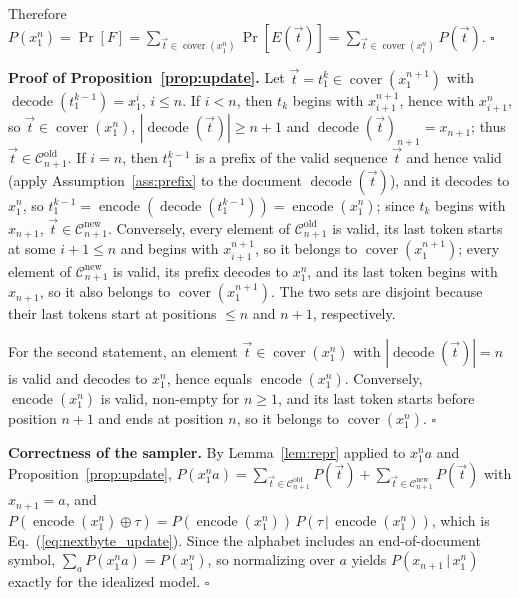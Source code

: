 \documentclass{article} %
\newcommand{\encf}{\operatorname{encode}}
\newcommand{\decf}{\operatorname{decode}}
\newcommand{\coverf}{\operatorname{cover}}
\newcommand{\cat}{\oplus}
\begin{document}
Therefore $P(x_1^n)=\Pr[F]=\sum_{\vec{t}\in\coverf(x_1^n)}\Pr[E(\vec{t})]=\sum_{\vec{t}\in\coverf(x_1^n)}P(\vec{t})$. \hfill$\square$

\textbf{Proof of Proposition~\ref{prop:update}.} Let $\vec{t}=t_1^k\in\coverf(x_1^{n+1})$ with $\decf(t_1^{k-1})=x_1^{i}$, $i\le n$. If $i<n$, then $t_k$ begins with $x_{i+1}^{n+1}$, hence with $x_{i+1}^n$, so $\vec{t}\in\coverf(x_1^n)$, $|\decf(\vec{t})|\ge n+1$ and $\decf(\vec{t})_{n+1}=x_{n+1}$; thus $\vec{t}\in\mathcal{C}^{\mathrm{old}}_{n+1}$. If $i=n$, then $t_1^{k-1}$ is a prefix of the valid sequence $\vec{t}$ and hence valid (apply Assumption~\ref{ass:prefix} to the document $\decf(\vec{t})$), and it decodes to $x_1^n$, so $t_1^{k-1}=\encf(\decf(t_1^{k-1}))=\encf(x_1^n)$; since $t_k$ begins with $x_{n+1}$, $\vec{t}\in\mathcal{C}^{\mathrm{new}}_{n+1}$. Conversely, every element of $\mathcal{C}^{\mathrm{old}}_{n+1}$ is valid, its last token starts at some $i+1\le n$ and begins with $x_{i+1}^{n+1}$, so it belongs to $\coverf(x_1^{n+1})$; every element of $\mathcal{C}^{\mathrm{new}}_{n+1}$ is valid, its prefix decodes to $x_1^n$, and its last token begins with $x_{n+1}$, so it also belongs to $\coverf(x_1^{n+1})$. The two sets are disjoint because their last tokens start at positions $\le n$ and $n+1$, respectively.

For the second statement, an element $\vec{t}\in\coverf(x_1^n)$ with $|\decf(\vec{t})|=n$ is valid and decodes to $x_1^n$, hence equals $\encf(x_1^n)$. Conversely, $\encf(x_1^n)$ is valid, non-empty for $n\ge1$, and its last token starts before position $n+1$ and ends at position $n$, so it belongs to $\coverf(x_1^n)$. \hfill$\square$

\textbf{Correctness of the sampler.} By Lemma~\ref{lem:repr} applied to $x_1^n a$ and Proposition~\ref{prop:update}, $P(x_1^n a)=\sum_{\vec{t}\in\mathcal{C}^{\mathrm{old}}_{n+1}}P(\vec{t})+\sum_{\vec{t}\in\mathcal{C}^{\mathrm{new}}_{n+1}}P(\vec{t})$ with $x_{n+1}=a$, and $P(\encf(x_1^n)\cat\tau)=P(\encf(x_1^n))\,P(\tau\,|\,\encf(x_1^n))$, which is Eq.~(\ref{eq:nextbyte_update}). Since the alphabet includes an end-of-document symbol, $\sum_{a}P(x_1^n a)=P(x_1^n)$, so normalizing over $a$ yields $P(x_{n+1}\,|\,x_1^n)$ exactly for the idealized model. \hfill$\square$
\end{document}
